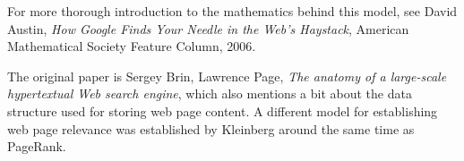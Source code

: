 \documentclass{tufte-handout}
\begin{document}
For more thorough introduction to the mathematics
  behind this model, see David Austin, \emph{How Google Finds Your Needle in
  the Web's Haystack}, American Mathematical Society Feature Column,
  2006.

The original paper is Sergey Brin, Lawrence Page, \emph{The anatomy of a
large-scale hypertextual Web search engine}, which also mentions a
bit about the data structure used for storing web page content.
A different model for establishing web page relevance was established
by Kleinberg around the same time as PageRank.
\end{document}
